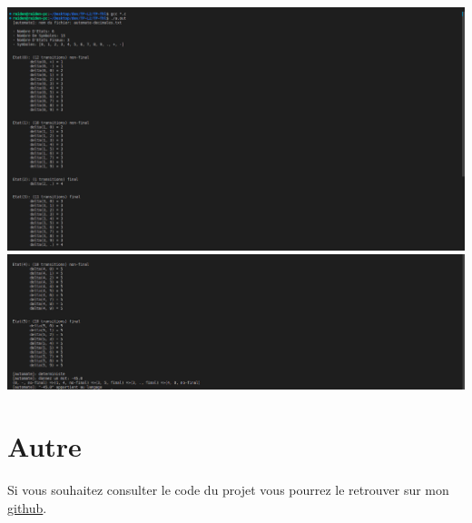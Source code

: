\documentclass{article}
\begin{document}
\includegraphics[width=\textwidth]{screen-1.png}
\includegraphics[width=\textwidth]{screen-2.png}

\section{Autre}

Si vous souhaitez consulter le code du projet vous pourrez le retrouver sur mon \href{https://www.github.com/raideno/projet}{github}.
\end{document}
